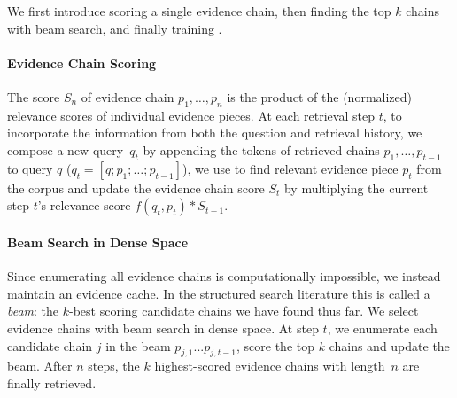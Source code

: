 We first introduce scoring a single evidence chain, then finding the
top $k$ chains with beam search, and finally training \name{}.
%
%


\paragraph{Evidence Chain Scoring}

The score $S_{n}$ of evidence chain ${p_{1},\dots,p_{n}}$ is the product of the
(normalized) relevance scores of individual evidence pieces.
%
At each retrieval step $t$, 
to incorporate the information from both the question and retrieval history, we compose  
a new query~$q_{t}$ by appending the tokens of retrieved chains $p_{1},\dots,p_{t - 1}$ 
to query $q$ ($q_t=[q;p_{1};\dots;p_{t-1}]$), we use  
to find relevant evidence piece $p_t$ from the corpus and update the
evidence chain score $S_t$ by multiplying the
current step $t$'s relevance score $f (q_{t}, p_{t}) * S_{t -1}$.

\paragraph{Beam Search in Dense Space}


Since enumerating all evidence chains is computationally impossible,
%
we instead maintain an evidence cache.
%
In the structured search literature this is called a \emph{beam}:
the $k$-best scoring candidate chains we have found thus far.
%
%
%
We select evidence chains with beam search in dense space.  At step
$t$, we enumerate each candidate chain $j$ in the beam $p_{j,
  1}...p_{j, t - 1}$, score the top $k$ chains and update the beam.
After $n$ steps, the $k$ highest-scored evidence chains with
length~$n$ are finally retrieved.


